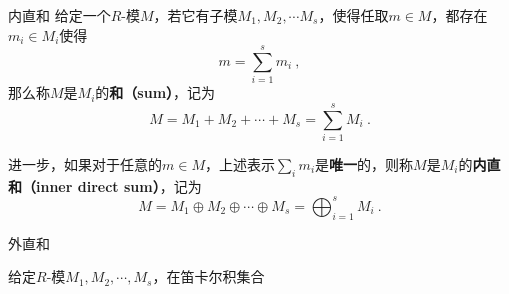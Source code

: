 





\begin{definition}{内直和}
给定一个$R$-模$M$，若它有子模$M_1, M_2, \cdots M_s$，使得任取$m\in M$，都存在$m_i\in M_i$使得
\begin{equation}
m = \sum_{i=1}^{s} m_i~, 
\end{equation}
那么称$M$是$M_i$的\textbf{和（sum）}，记为
\begin{equation}
M=M_1+M_2+\cdots+M_s=\sum_{i=1}^s M_i~.
\end{equation}

进一步，如果对于任意的$m\in M$，上述表示$\sum_i m_i$是\textbf{唯一}的，则称$M$是$M_i$的\textbf{内直和（inner direct sum）}，记为
\begin{equation}
M=M_1\oplus M_2\oplus \cdots \oplus M_s= \bigoplus_{i=1}^s M_i~.
\end{equation}
\end{definition}


\begin{definition}{外直和}

给定$R$-模$M_1, M_2, \cdots, M_s$，在笛卡尔积集合$$

\end{definition}














